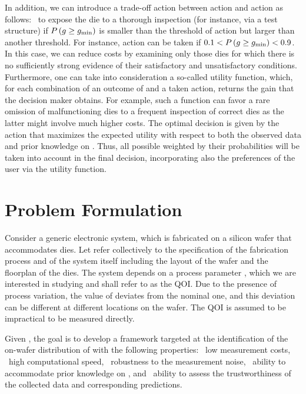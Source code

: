 In addition, we can introduce a trade-off action between action \one and action
\two as follows: \three~to expose the die to a thorough inspection (for
instance, via a test structure) if $P\left(g \geq g_{\mathrm{min}}\right)$ is
smaller than the threshold of action \one but larger than another threshold. For
instance, action \three can be taken if $0.1 < P\left(g \geq g_{\mathrm{min}}\right)
< 0.9$. In this case, we can reduce costs by examining only those dies for which
there is no sufficiently strong evidence of their satisfactory and
unsatisfactory conditions. Furthermore, one can take into consideration a
so-called utility function, which, for each combination of an outcome of \g and
a taken action, returns the gain that the decision maker obtains. For example,
such a function can favor a rare omission of malfunctioning dies to a frequent
inspection of correct dies as the latter might involve much higher costs. The
optimal decision is given by the action that maximizes the expected utility with
respect to both the observed data and prior knowledge on \g. Thus, all possible
\g weighted by their probabilities will be taken into account in the final
decision, incorporating also the preferences of the user via the utility
function.

\section{Problem Formulation}

Consider a generic electronic system, which is fabricated on a silicon wafer
that accommodates \nd dies. Let \spec refer collectively to the specification of
the fabrication process and of the system itself including the layout of the
wafer and the floorplan of the dies. The system depends on a process parameter
\g, which we are interested in studying and shall refer to as the \ac{QOI}. Due
to the presence of process variation, the value of \g deviates from the nominal
one, and this deviation can be different at different locations on the wafer.
The \ac{QOI} is assumed to be impractical to be measured directly.

Given \spec, the goal is to develop a framework targeted at the identification
of the on-wafer distribution of \g with the following properties: \one~low
measurement costs, \two~high computational speed, \three~robustness to the
measurement noise, \four~ability to accommodate prior knowledge on \g, and
\five~ability to assess the trustworthiness of the collected data and
corresponding predictions.

